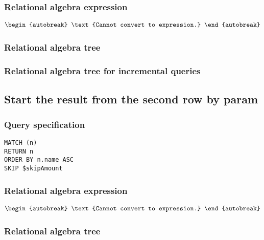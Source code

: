 \subsubsection*{Relational algebra expression}

\begin{align*}
\begin{autobreak}
\text{Cannot convert to expression.}
\end{autobreak}
\end{align*}

\subsubsection*{Relational algebra tree}


\subsubsection*{Relational algebra tree for incremental queries}


\subsection{Start the result from the second row by param}

\subsubsection*{Query specification}

\begin{lstlisting}
MATCH (n)
RETURN n
ORDER BY n.name ASC
SKIP $skipAmount
\end{lstlisting}

\subsubsection*{Relational algebra expression}

\begin{align*}
\begin{autobreak}
\text{Cannot convert to expression.}
\end{autobreak}
\end{align*}

\subsubsection*{Relational algebra tree}

